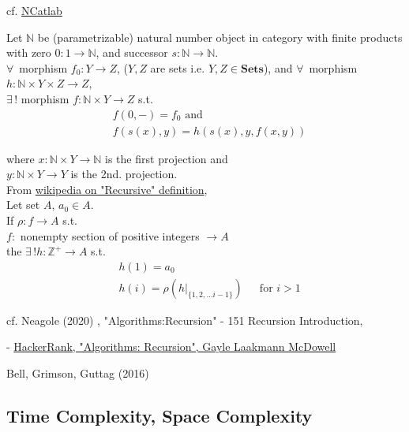 \documentclass[10pt]{amsart}
\begin{document}
cf. \href{https://ncatlab.org/nlab/show/recursion}{NCatlab}

Let $\mathbb{N}$ be (parametrizable) natural number object in category with finite products with zero $0 : 1 \to \mathbb{N}$, and successor $s: \mathbb{N} \to \mathbb{N}$. \\
$\forall \, $ morphism $f_0 : Y \to Z$, ($Y, Z$ are sets i.e. $Y,Z \in \textbf{Sets}$), and $\forall \, $ morphism $h: \mathbb{N} \times Y \times Z \to Z$, \\
$\exists \, !$ morphism $f: \mathbb{N} \times Y \to Z$ s.t.
\begin{equation}
\begin{aligned} 
& f(0, -) = f_0 \text{ and } \\
& f(s(x), y) = h(s(x), y, f(x,y))
\end{aligned}
\end{equation}

where $x: \mathbb{N} \times Y \to \mathbb{N}$ is the first projection and \\
\phantom{where } $y : \mathbb{N} \times Y \to Y$ is the 2nd. projection.  \\

From \href{https://en.wikipedia.org/wiki/Recursive_definition}{wikipedia on "Recursive" definition}, \\
Let set $A$, $a_0 \in A$. \\
If $\rho : f \to A$ s.t. \\
\phantom{If $\rho $ } $f: $ nonempty section of positive integers $\to A$ \\
the $\exists \, ! h : \mathbb{Z}^+ \to A$ s.t. \\
\begin{equation}
\begin{aligned}
& h(1) = a_0 \\ 
& h(i) = \rho( \left. h \right|_{\lbrace 1, 2, \dots i -1 \rbrace }) \quad \, \text{ for } i > 1
\end{aligned}
\end{equation}

cf. Neagole (2020) \cite{Neag2020}, "Algorithms:Recursion" - 151 Recursion Introduction, 


- \href{https://youtu.be/KEEKn7Me-ms}{HackerRank, "Algorithms: Recursion",  Gayle Laakmann McDowell}

Bell, Grimson, Guttag (2016) \cite{BGG2016}

\subsection{Time Complexity, Space Complexity}
\end{document}
